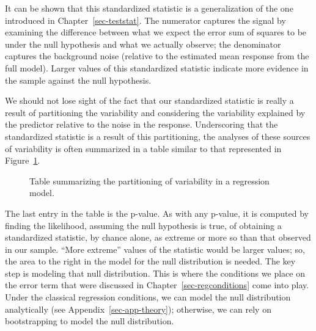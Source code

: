 \documentclass[
  letterpaper,
  DIV=11,
  numbers=noendperiod]{scrreprt}
\theoremstyle{plain}
\theoremstyle{definition}
\theoremstyle{definition}
\theoremstyle{remark}
\begin{document}
It can be shown that this standardized statistic is a generalization of
the one introduced in Chapter~\ref{sec-teststat}. The numerator captures
the signal by examining the difference between what we expect the error
sum of squares to be under the null hypothesis and what we actually
observe; the denominator captures the background noise (relative to the
estimated mean response from the full model). Larger values of this
standardized statistic indicate more evidence in the sample against the
null hypothesis.

We should not lose sight of the fact that our standardized statistic is
really a result of partitioning the variability and considering the
variability explained by the predictor relative to the noise in the
response. Underscoring that the standardized statistic is a result of
this partitioning, the analyses of these sources of variability is often
summarized in a table similar to that represented in
Figure~\ref{fig-regquality-ANOVA-table}.

\begin{figure}


\caption{\label{fig-regquality-ANOVA-table}Table summarizing the
partitioning of variability in a regression model.}

\end{figure}%

The last entry in the table is the p-value. As with any p-value, it is
computed by finding the likelihood, assuming the null hypothesis is
true, of obtaining a standardized statistic, by chance alone, as extreme
or more so than that observed in our sample. ``More extreme'' values of
the statistic would be larger values; so, the area to the right in the
model for the null distribution is needed. The key step is modeling that
null distribution. This is where the conditions we place on the error
term that were discussed in Chapter~\ref{sec-regconditions} come into
play. Under the classical regression conditions, we can model the null
distribution analytically (see Appendix~\ref{sec-app-theory});
otherwise, we can rely on bootstrapping to model the null distribution.
\end{document}

